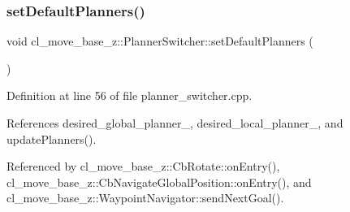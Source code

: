 \subsubsection{\texorpdfstring{set\+Default\+Planners()}{setDefaultPlanners()}}
{\footnotesize\ttfamily void cl\+\_\+move\+\_\+base\+\_\+z\+::\+Planner\+Switcher\+::set\+Default\+Planners (\begin{DoxyParamCaption}{ }\end{DoxyParamCaption})}



Definition at line 56 of file planner\+\_\+switcher.\+cpp.



References desired\+\_\+global\+\_\+planner\+\_\+, desired\+\_\+local\+\_\+planner\+\_\+, and update\+Planners().



Referenced by cl\+\_\+move\+\_\+base\+\_\+z\+::\+Cb\+Rotate\+::on\+Entry(), cl\+\_\+move\+\_\+base\+\_\+z\+::\+Cb\+Navigate\+Global\+Position\+::on\+Entry(), and cl\+\_\+move\+\_\+base\+\_\+z\+::\+Waypoint\+Navigator\+::send\+Next\+Goal().


